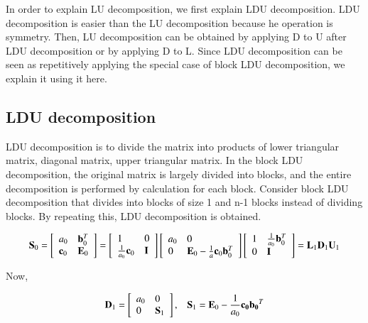In order to explain LU decomposition, we first explain LDU decomposition. 
%
LDU decomposition is easier than the LU decomposition because  he operation is symmetry.
%
Then, LU decomposition can be obtained by applying D to U after LDU decomposition or by applying D to L. 
%
Since LDU decomposition can be seen as repetitively applying the special case of block LDU decomposition, we explain it using it here.

\subsection{LDU decomposition}

LDU decomposition is to divide the matrix into products of lower triangular matrix, diagonal matrix, upper triangular matrix. In the block LDU decomposition, the original matrix is ​​largely divided into blocks, and the entire decomposition is performed by calculation for each block. Consider block LDU decomposition that divides into blocks of size 1 and n-1 blocks instead of dividing blocks. By repeating this, LDU decomposition is obtained.

\begin{eqnarray}
\mathbf{S}_0=\left[\begin{array}{ll}
a_0 & \mathbf{b}^T_0\\
\mathbf{c}_0 & \mathbf{E}_0
\end{array}\right]
=
\left[\begin{array}{ll}
1 & 0\\
\frac{1}{a_0}\mathbf{c}_0 & \mathbf{I}
\end{array}\right]
\left[\begin{array}{ll}
a_0 & 0\\
0 & \mathbf{E}_0 - \frac{1}{a}\mathbf{c}_0\mathbf{b}_0^T
\end{array}\right]
\left[\begin{array}{ll}
1 & \frac{1}{a_0}\mathbf{b}_0^T\\
0 & \mathbf{I}
\end{array}\right] = \mathbf{L}_1 \mathbf{D}_1 \mathbf{U}_1
\end{eqnarray}

Now,

\begin{eqnarray}
\mathbf{D}_1
= \left[\begin{array}{ll}
a_0 & 0\\
0 & \mathbf{S}_1
\end{array}\right],\;\;\;\mathbf{S}_1 = \mathbf{E}_0 - \frac{1}{a_0}\mathbf{c_0}\mathbf{b_0}^T
\end{eqnarray}


